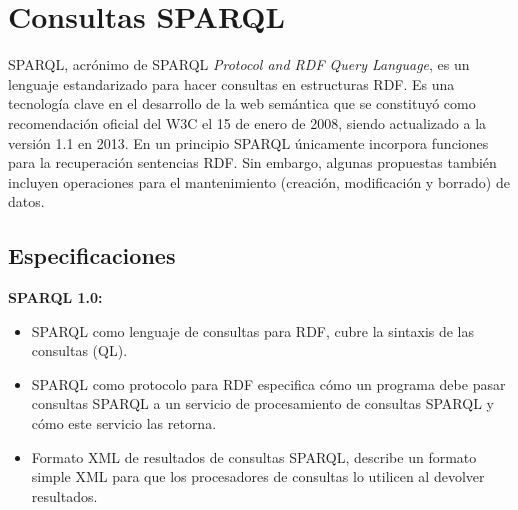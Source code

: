 \documentclass[conference]{IEEEtran}
\begin{document}
\section{Consultas SPARQL}


SPARQL, acrónimo de SPARQL \textit{Protocol and RDF Query Language}, es un lenguaje estandarizado para hacer consultas en estructuras RDF.  Es una tecnología clave en el desarrollo de la web semántica que se constituyó como recomendación oficial del W3C el 15 de enero de 2008, siendo actualizado a la versión 1.1 en 2013\cite{b1}. En un principio SPARQL únicamente incorpora funciones para la recuperación sentencias RDF. Sin embargo, algunas propuestas también incluyen operaciones para el mantenimiento (creación, modificación y borrado) de datos.

\subsection{Especificaciones}

\textbf{SPARQL 1.0:}

\begin{itemize}
	\item SPARQL como lenguaje de consultas para RDF, cubre la sintaxis de las consultas (QL).
	\item SPARQL como protocolo para RDF especifica cómo un programa debe pasar consultas SPARQL a un servicio de procesamiento de consultas SPARQL y cómo este servicio las retorna. 
	\item Formato XML de resultados de consultas SPARQL, describe un formato simple XML para que los procesadores de consultas lo utilicen al devolver resultados.
	
\end{itemize}
\end{document}
